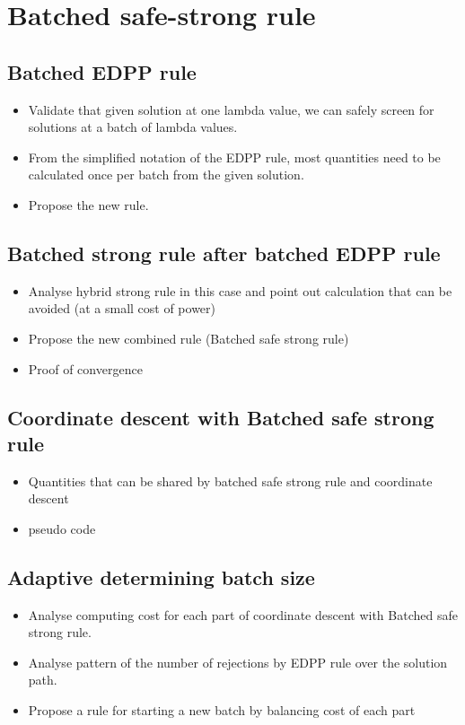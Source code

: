 \documentclass{article}
\begin{document}
\section{Batched safe-strong rule}
\label{sec:method}

\subsection{Batched EDPP rule}
\begin{itemize}
    \item Validate that given solution at one lambda value, we can safely screen for solutions at a batch of lambda values.
    \item From the simplified notation of the EDPP rule, most quantities need to be calculated once per batch from the given solution.
    \item Propose the new rule.
\end{itemize}

\subsection{Batched strong rule after batched EDPP rule}
\begin{itemize}
    \item Analyse hybrid strong rule in this case and point out calculation that can be avoided (at a small cost of power)
    \item Propose the new combined rule (Batched safe strong rule)
    \item Proof of convergence
\end{itemize}

\subsection{Coordinate descent with Batched safe strong rule}

\begin{itemize}
    \item Quantities that can be shared by batched safe strong rule and coordinate descent
    \item pseudo code
\end{itemize}

\subsection{Adaptive determining batch size}
\label{sec:batch-size}
\begin{itemize}
    \item Analyse computing cost for each part of coordinate descent with Batched safe strong rule.
    \item Analyse pattern of the number of rejections by EDPP rule over the solution path.
    \item Propose a rule for starting a new batch by balancing cost of each part
\end{itemize}
\end{document}
